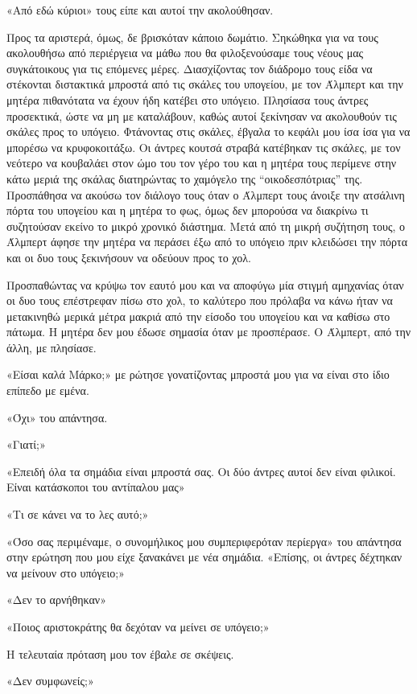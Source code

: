\documentclass[12pt,twoside, openany]{book}
\begin{document}
«Από εδώ κύριοι» τους είπε και αυτοί την ακολούθησαν.

Προς τα αριστερά, όμως, δε βρισκόταν κάποιο δωμάτιο. Σηκώθηκα για να τους ακολουθήσω από περιέργεια να μάθω που θα φιλοξενούσαμε τους νέους μας συγκάτοικους για τις επόμενες μέρες. Διασχίζοντας τον διάδρομο τους είδα να στέκονται διστακτικά μπροστά από τις σκάλες του υπογείου, με τον Άλμπερτ και την μητέρα πιθανότατα να έχουν ήδη κατέβει στο υπόγειο. Πλησίασα τους άντρες προσεκτικά, ώστε να μη με καταλάβουν, καθώς αυτοί ξεκίνησαν να ακολουθούν τις σκάλες προς το υπόγειο. Φτάνοντας στις σκάλες, έβγαλα το κεφάλι μου ίσα ίσα για να μπορέσω να κρυφοκοιτάξω. Οι άντρες κουτσά στραβά κατέβηκαν τις σκάλες, με τον νεότερο να κουβαλάει στον ώμο του τον γέρο του και η μητέρα τους περίμενε στην κάτω μεριά της σκάλας διατηρώντας το χαμόγελο της “οικοδεσπότριας” της. Προσπάθησα να ακούσω τον διάλογο τους όταν ο Άλμπερτ τους άνοιξε την ατσάλινη πόρτα του υπογείου και η μητέρα το φως, όμως δεν μπορούσα να διακρίνω τι συζητούσαν εκείνο το μικρό χρονικό διάστημα. Μετά από τη μικρή συζήτηση τους, ο Άλμπερτ άφησε την μητέρα να περάσει έξω από το υπόγειο πριν κλειδώσει την πόρτα και οι δυο τους ξεκινήσουν να οδεύουν προς το χολ.

Προσπαθώντας να κρύψω τον εαυτό μου και να αποφύγω μία στιγμή αμηχανίας όταν οι δυο τους επέστρεφαν πίσω στο χολ, το καλύτερο που πρόλαβα να κάνω ήταν να μετακινηθώ μερικά μέτρα μακριά από την είσοδο του υπογείου και να καθίσω στο πάτωμα. Η μητέρα δεν μου έδωσε σημασία όταν με προσπέρασε. Ο Άλμπερτ, από την άλλη, με πλησίασε.

«Είσαι καλά Μάρκο;» με ρώτησε γονατίζοντας μπροστά μου για να είναι στο ίδιο επίπεδο με εμένα.

«Όχι» του απάντησα.

«Γιατί;»

«Επειδή όλα τα σημάδια είναι μπροστά σας. Οι δύο άντρες αυτοί δεν είναι φιλικοί. Είναι κατάσκοποι του αντίπαλου μας»

«Τι σε κάνει να το λες αυτό;»

«Όσο σας περιμέναμε, ο συνομήλικος μου συμπεριφερόταν περίεργα» του απάντησα στην ερώτηση που μου είχε ξανακάνει με νέα σημάδια. «Επίσης, οι άντρες δέχτηκαν να μείνουν στο υπόγειο;»

«Δεν το αρνήθηκαν»

«Ποιος αριστοκράτης θα δεχόταν να μείνει σε υπόγειο;»

Η τελευταία πρόταση μου τον έβαλε σε σκέψεις.

«Δεν συμφωνείς;» 
\end{document}
